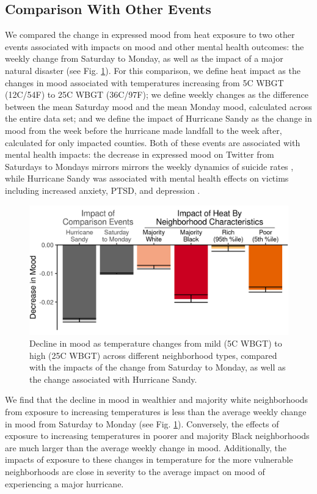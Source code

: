 \documentclass[9pt,twocolumn,twoside,lineno]{pnas-new}
\begin{document}
\subsection*{Comparison With Other Events}
We compared the change in expressed mood from heat exposure to two other events associated with impacts on mood and other mental health outcomes: the weekly change from Saturday to Monday, as well as the impact of a major natural disaster (see Fig. \ref{fig:compare}). For this comparison, we define heat impact as the changes in mood associated with temperatures increasing from 5\textdegree C WBGT (12\textdegree C/54\textdegree F) to 25\textdegree C WBGT (36\textdegree C/97\textdegree F); we define weekly changes as the difference between the mean Saturday mood and the mean Monday mood, calculated across the entire data set; and we define the impact of Hurricane Sandy as the change in mood from the week before the hurricane made landfall to the week after, calculated for only impacted counties. Both of these events are associated with mental health impacts: the decrease in expressed mood on Twitter from Saturdays to Mondays mirrors mirrors the weekly dynamics of suicide rates \cite{CDC2021}, while Hurricane Sandy was associated with mental health effects on victims including increased anxiety, PTSD, and depression \cite{Schwartz2017Aug, Lieberman-Cribbin2017}.

\begin{figure}[H]
 \centering
 \includegraphics[width=0.9\linewidth]{../../res/comparison_plot.png}
 \caption{Decline in mood as temperature changes from mild (5\textdegree C WBGT) to high (25\textdegree C WBGT) across different neighborhood types, compared with the impacts of the change from Saturday to Monday, as well as the change associated with Hurricane Sandy.}
 \label{fig:compare}
\end{figure}

We find that the decline in mood in wealthier and majority white neighborhoods from exposure to increasing temperatures is less than the average weekly change in mood from Saturday to Monday (see Fig. \ref{fig:compare}). Conversely, the effects of exposure to increasing temperatures in poorer and majority Black neighborhoods are much larger than the average weekly change in mood. Additionally, the impacts of exposure to these changes in temperature for the more vulnerable neighborhoods are close in severity to the average impact on mood of experiencing a major hurricane.
\end{document}
